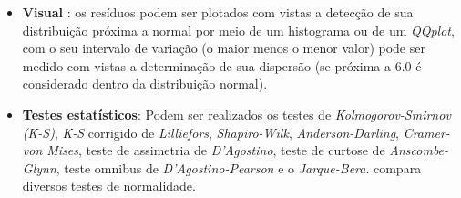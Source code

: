 \begin{itemize}
    \item \textbf{Visual} : os  resíduos podem ser plotados com vistas a detecção de sua distribuição próxima a normal por meio de um histograma ou de um \textit{QQplot}, com o seu intervalo de variação (o maior menos o menor valor) pode ser medido com vistas a  determinação  de  sua  dispersão  (se  próxima  a  6.0  é  considerado  dentro  da distribuição normal).
    
    \item \textbf{Testes estatísticos}: Podem ser realizados os testes de \textit{Kolmogorov-Smirnov (K-S)}, \textit{K-S} corrigido de \textit{Lilliefors}, \textit{Shapiro-Wilk}, \textit{Anderson-Darling}, \textit{Cramer-von Mises}, teste de assimetria de \textit{D’Agostino}, teste de curtose de \textit{Anscombe-Glynn}, teste omnibus de \textit{D’Agostino-Pearson} e o \textit{Jarque-Bera}.  compara diversos testes de normalidade.
\end{itemize}